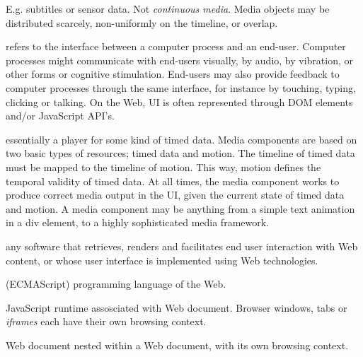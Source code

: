 E.g. subtitles or sensor data. Not \emph{continuous media}.
Media objects may be distributed scarcely, non-uniformly on the
timeline, or overlap.


refers to the interface between a computer process and an end-user. Computer
processes might communicate with end-users visually, by audio, by vibration,
or other forms or cognitive stimulation. End-users may also provide feedback
to computer processes through the same interface, for instance by touching,
typing, clicking or talking. On the Web, UI is often represented through DOM
elements and/or JavaScript API’s.


essentially a player for some kind of timed data. Media components are based
on two basic types of resources; timed data and motion. The timeline of timed
data must be mapped to the timeline of motion. This way, motion defines the
temporal validity of timed data. At all times, the media component works to
produce correct media output in the UI, given the current state of timed data
and motion. A media component may be anything from a simple text animation in
a div element, to a highly sophisticated media framework.


any software that retrieves, renders and facilitates end user interaction with
Web content, or whose user interface is implemented using Web technologies.


(ECMAScript) programming language of the Web. 


JavaScript runtime assosciated with Web document. Browser windows, tabs or
\emph{iframes} each have their own browsing context.


Web document nested within a Web document, with its own browsing context.

